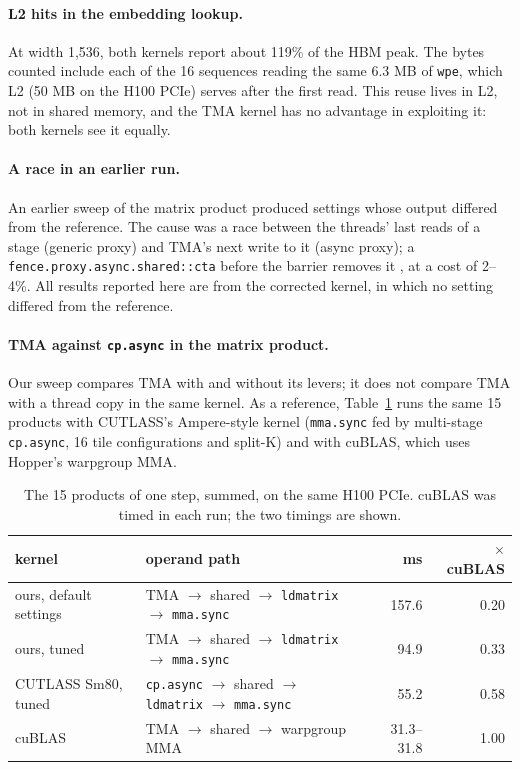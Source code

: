 \documentclass[10pt]{article}
\newcommand{\x}{\ensuremath{\times}}
\begin{document}
\paragraph{L2 hits in the embedding lookup.}
At width 1{,}536, both kernels report about 119\% of the HBM peak. The bytes counted include each of the 16 sequences
reading the same 6.3 MB of \texttt{wpe}, which L2 (50 MB on the H100 PCIe) serves after the first read. This reuse lives in
L2, not in shared memory, and the TMA kernel has no advantage in exploiting it: both kernels see it equally.

\paragraph{A race in an earlier run.}
An earlier sweep of the matrix product produced settings whose output differed from the reference. The cause was a race
between the threads' last reads of a stage (generic proxy) and TMA's next write to it (async proxy); a
\texttt{fence.proxy.async.shared::cta} before the barrier removes it \citep{nvidia2024ptx}, at a cost of 2--4\%. All results
reported here are from the corrected kernel, in which no setting differed from the reference.

\paragraph{TMA against \texttt{cp.async} in the matrix product.}
Our sweep compares TMA with and without its levers; it does not compare TMA with a thread copy in the same kernel. As a
reference, Table~\ref{tab:baselines} runs the same 15 products with CUTLASS's Ampere-style kernel \citep{thakkar2023cutlass}
(\texttt{mma.sync} fed by multi-stage \texttt{cp.async}, 16 tile configurations and split-K) and with cuBLAS, which uses
Hopper's warpgroup MMA.

\begin{table}[t]
  \centering
  \caption{The 15 products of one step, summed, on the same H100 PCIe. cuBLAS was timed in each run; the two timings
  are shown.}
  \label{tab:baselines}
  \small
  \begin{tabular}{@{}llrr@{}}
    \toprule
    kernel & operand path & ms & \x{} cuBLAS \\
    \midrule
    ours, default settings                 & TMA $\to$ shared $\to$ \texttt{ldmatrix} $\to$ \texttt{mma.sync} & 157.6 & 0.20 \\
    ours, tuned                            & TMA $\to$ shared $\to$ \texttt{ldmatrix} $\to$ \texttt{mma.sync} & 94.9  & 0.33 \\
    CUTLASS Sm80, tuned                    & \texttt{cp.async} $\to$ shared $\to$ \texttt{ldmatrix} $\to$ \texttt{mma.sync} & 55.2 & 0.58 \\
    cuBLAS                                 & TMA $\to$ shared $\to$ warpgroup MMA & 31.3--31.8 & 1.00 \\
    \bottomrule
  \end{tabular}
\end{table}
\end{document}
